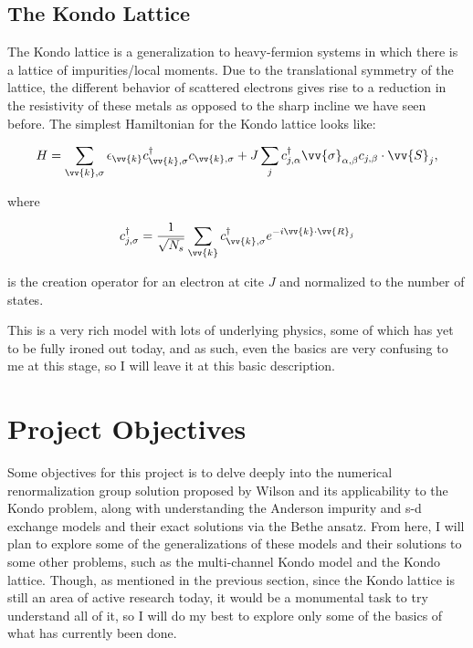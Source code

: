 \subsection{The Kondo Lattice}

The Kondo lattice is a generalization to heavy-fermion systems in which there is a lattice of impurities/local moments. Due to the translational symmetry of the lattice, the different behavior of scattered electrons gives rise to a reduction in the resistivity of these metals as opposed to the sharp incline we have seen before. The simplest Hamiltonian for the Kondo lattice looks like:

\begin{equation}
  H = \sum_{\vv{k},\sigma} \epsilon_{\vv{k}}c_{\vv{k},\sigma}^\dagger c_{\vv{k},\sigma} + J \sum_j c_{j,\alpha}^\dagger \vv{\sigma}_{\alpha,\beta} c_{j,\beta} \cdot \vv{S}_j,
\end{equation}

where

\begin{equation}
  c_{j,\sigma}^\dagger = \frac{1}{\sqrt{N_s}} \sum_{\vv{k}} c_{\vv{k},\sigma}^\dagger e^{-i\vv{k}\cdot\vv{R}_j}
\end{equation}

is the creation operator for an electron at cite $J$ and normalized to the number of states.

This is a very rich model with lots of underlying physics, some of which has yet to be fully ironed out today, and as such, even the basics are very confusing to me at this stage, so I will leave it at this basic description.


\section{Project Objectives}

Some objectives for this project is to delve deeply into the numerical renormalization group solution proposed by Wilson and its applicability to the Kondo problem, along with understanding the Anderson impurity and s-d exchange models and their exact solutions via the Bethe ansatz. From here, I will plan to explore some of the generalizations of these models and their solutions to some other problems, such as the multi-channel Kondo model and the Kondo lattice. Though, as mentioned in the previous section, since the Kondo lattice is still an area of active research today, it would be a monumental task to try understand all of it, so I will do my best to explore only some of the basics of what has currently been done.

